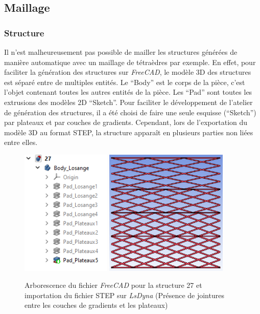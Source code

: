 \documentclass[a4paper]{article}
\begin{document}
	\subsection{Maillage}
	\subsubsection{Structure}
	
	\hspace{0.5cm}Il n’est malheureusement pas possible de mailler les structures générées de manière automatique avec un maillage de tétraèdres par exemple. En effet, pour faciliter la génération des structures sur \textit{FreeCAD}, le modèle 3D des structures est séparé entre de multiples entités. Le “Body” est le corps de la pièce, c’est l’objet contenant toutes les autres entités de la pièce. Les “Pad” sont toutes les extrusions des modèles 2D “Sketch”. Pour faciliter le développement de l’atelier de génération des structures, il a été choisi de faire une seule esquisse (“Sketch”) par plateaux et par couches de gradients. Cependant, lors de l’exportation du modèle 3D au format STEP, la structure apparaît en plusieurs parties non liées entre elles.
	
	\begin{figure}[H]
		\centering
		\includegraphics[height=6cm]{Images/8/8_1/arborescence_freecad.png}
		\includegraphics[height=6cm]{Images/8/8_1/step_lsdyna.png}\\
		\caption{Arborescence du fichier \textit{FreeCAD} pour la structure 27 et importation du fichier STEP sur \textit{LsDyna} (Présence de jointures entre les couches de gradients et les plateaux)}
	\end{figure}
	
\end{document}
